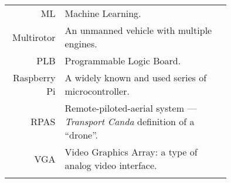 \begin{tabular}[h]{rp{0.75\linewidth}}
    ML & Machine Learning.\\
    Multirotor & An unmanned vehicle with multiple engines. \\
    PLB & Programmable Logic Board. \\
    Raspberry Pi & A widely known and used series of microcontroller. \\
    RPAS & Remote-piloted-aerial system --- \textit{Transport Canda} definition of a ``drone''.\\
    VGA & Video Graphics Array: a type of analog video interface. \\
     & \\

    \hline

\end{tabular}
